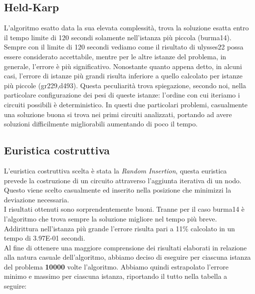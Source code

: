 \documentclass{article}
\begin{document}
\subsection*{Held-Karp}
L'algoritmo esatto data la sua elevata complessità, trova la soluzione esatta entro il tempo limite di 120 secondi solamente nell'istanza più piccola (burma14). Sempre con il limite di 120 secondi vediamo come il risultato di ulysses22 possa essere considerato accettabile, mentre per le altre istanze del problema, in generale, l'errore è più significativo. Nonostante quanto appena detto, in alcuni casi, l'errore di istanze più grandi risulta inferiore a quello calcolato per istanze più piccole (gr229,d493). Questa peculiarità trova spiegazione, secondo noi, nella particolare configurazione dei pesi di queste istanze: l'ordine con cui iteriamo i circuiti possibili è deterministico. In questi due particolari problemi, casualmente una soluzione buona si trova nei primi circuiti analizzati, portando ad avere soluzioni difficilmente migliorabili aumentando di poco il tempo.

\subsection*{Euristica costruttiva}
L'euristica costruttiva scelta è stata la \textit{Random Insertion}, questa euristica prevede la costruzione di un circuito attraverso l'aggiunta iterativa di un nodo. 
Questo viene scelto casualmente ed inserito nella posizione che minimizzi la deviazione necessaria.\\
I risultati ottenuti sono sorprendentemente buoni. Tranne per il caso burma14 è l'algoritmo che trova sempre la soluzione migliore nel tempo più breve. Addirittura nell'istanza più grande l'errore risulta pari a 11\% calcolato in un tempo di 3.97E-01 secondi.\\
Al fine di ottenere una maggiore comprensione dei risultati elaborati in relazione alla natura casuale dell'algoritmo, abbiamo deciso di eseguire per ciascuna istanza del problema \textbf{10000} volte l'algoritmo. Abbiamo quindi estrapolato l'errore minimo e massimo per ciascuna istanza, riportando il tutto nella tabella a seguire:\\ 
\end{document}
